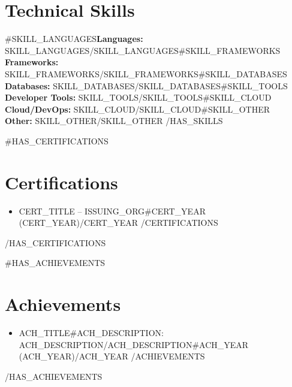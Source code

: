 \documentclass[10pt,letterpaper]{article}
\begin{document}
\section*{Technical Skills}
{{#SKILL_LANGUAGES}}\textbf{Languages:} {{SKILL_LANGUAGES}}{{/SKILL_LANGUAGES}}{{#SKILL_FRAMEWORKS}}
\\\textbf{Frameworks:} {{SKILL_FRAMEWORKS}}{{/SKILL_FRAMEWORKS}}{{#SKILL_DATABASES}}
\\\textbf{Databases:} {{SKILL_DATABASES}}{{/SKILL_DATABASES}}{{#SKILL_TOOLS}}
\\\textbf{Developer Tools:} {{SKILL_TOOLS}}{{/SKILL_TOOLS}}{{#SKILL_CLOUD}}
\\\textbf{Cloud/DevOps:} {{SKILL_CLOUD}}{{/SKILL_CLOUD}}{{#SKILL_OTHER}}
\\\textbf{Other:} {{SKILL_OTHER}}{{/SKILL_OTHER}}
{{/HAS_SKILLS}}

{{#HAS_CERTIFICATIONS}}
\section*{Certifications}
\begin{itemize}
{{#CERTIFICATIONS}}
\item {{CERT_TITLE}} -- {{ISSUING_ORG}}{{#CERT_YEAR}} ({{CERT_YEAR}}){{/CERT_YEAR}}
{{/CERTIFICATIONS}}
\end{itemize}
{{/HAS_CERTIFICATIONS}}

{{#HAS_ACHIEVEMENTS}}
\section*{Achievements}
\begin{itemize}
{{#ACHIEVEMENTS}}
\item {{ACH_TITLE}}{{#ACH_DESCRIPTION}}: {{ACH_DESCRIPTION}}{{/ACH_DESCRIPTION}}{{#ACH_YEAR}} ({{ACH_YEAR}}){{/ACH_YEAR}}
{{/ACHIEVEMENTS}}
\end{itemize}
{{/HAS_ACHIEVEMENTS}}
\end{document}
